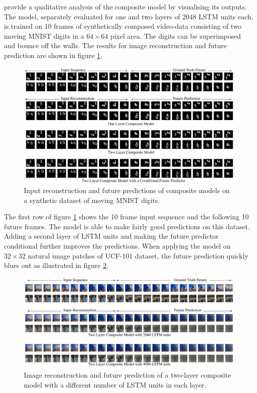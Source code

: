 \textcite{srivastava_unsupervised_2015} provide a qualitative analysis of the composite model by visualising its outputs.
The model, separately evaluated for one and two layers of $2048$ LSTM units each, is trained on 10 frames of synthetically composed video-data consisting of two moving MNIST digits in a $64 \times 64$ pixel area.
The digits can be superimposed and bounce off the walls.
The results for image reconstruction and future prediction are shown in figure \ref{fig:unsupervisedlstms_movingmnist}.

\begin{figure}[H]
    \centering
    \includegraphics[width=\textwidth]{img_deep/unsupervisedlstms_movingmnist}
    \caption{Input reconstruction and future predictions of composite models on a synthetic dataset of moving MNIST digits. \cite{srivastava_unsupervised_2015}}
    \label{fig:unsupervisedlstms_movingmnist}
\end{figure}

The first row of figure \ref{fig:unsupervisedlstms_movingmnist} shows the 10 frame input sequence and the following 10 future frames.
The model is able to make fairly good predictions on this dataset.
Adding a second layer of LSTM units and making the future predictor conditional further improves the predictions.
When applying the model on $32 \times 32$ natural image patches of UCF-101 dataset, the future prediction quickly blurs out as illustrated in figure \ref{fig:unsupervisedlstms_ucfpatches}.

\begin{figure}[h]
    \centering
    \includegraphics[width=\textwidth]{img_deep/unsupervisedlstms_ucfpatches.png}
    \caption{Image reconstruction and future prediction of a two-layer composite model with a different number of LSTM units in each layer. \cite{srivastava_unsupervised_2015}}
    \label{fig:unsupervisedlstms_ucfpatches}
\end{figure}

